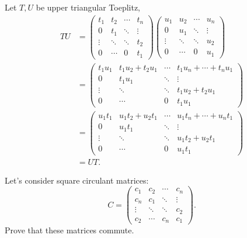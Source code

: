 \begin{solution}
  Let $T,U$ be upper triangular Toeplitz,
  \begin{align*}
    TU
    & =
    \begin{pmatrix}
      t_1 & t_2 & \cdots & t_n\\
      0   & t_1 & \ddots & \vdots\\
      \vdots & \ddots & \ddots & t_2\\
      0 & \cdots & 0 & t_1
    \end{pmatrix}
    \begin{pmatrix}
      u_1 & u_2 & \cdots & u_n\\
      0   & u_1 & \ddots & \vdots\\
      \vdots & \ddots & \ddots & u_2\\
      0 & \cdots & 0 & u_1
    \end{pmatrix}\\
    & =
    \begin{pmatrix}
      t_1u_1 & t_1u_2 + t_2u_1 & \cdots & t_1u_n + \cdots + t_nu_1\\
      0   & t_1u_1 & \ddots & \vdots\\
      \vdots & \ddots & \ddots & t_1u_2 + t_2u_1\\
      0 & \cdots & 0 & t_1u_1
    \end{pmatrix}\\
    & =
    \begin{pmatrix}
      u_1t_1 & u_1t_2 + u_2t_1 & \cdots & u_1t_n + \cdots + u_nt_1\\
      0   & u_1t_1 & \ddots & \vdots\\
      \vdots & \ddots & \ddots & u_1t_2 + u_2t_1\\
      0 & \cdots & 0 & u_1t_1
    \end{pmatrix}\\
    & = UT.
  \end{align*}
\end{solution}

Let's consider square circulant matrices:
\[
  C =
  \begin{pmatrix}
    c_1 & c_2 & \cdots & c_n\\
    c_n & c_1 & \ddots & \vdots\\
    \vdots & \ddots & \ddots & c_2\\
    c_2 & \cdots & c_n & c_1
  \end{pmatrix}.
\]
Prove that these matrices commute.

